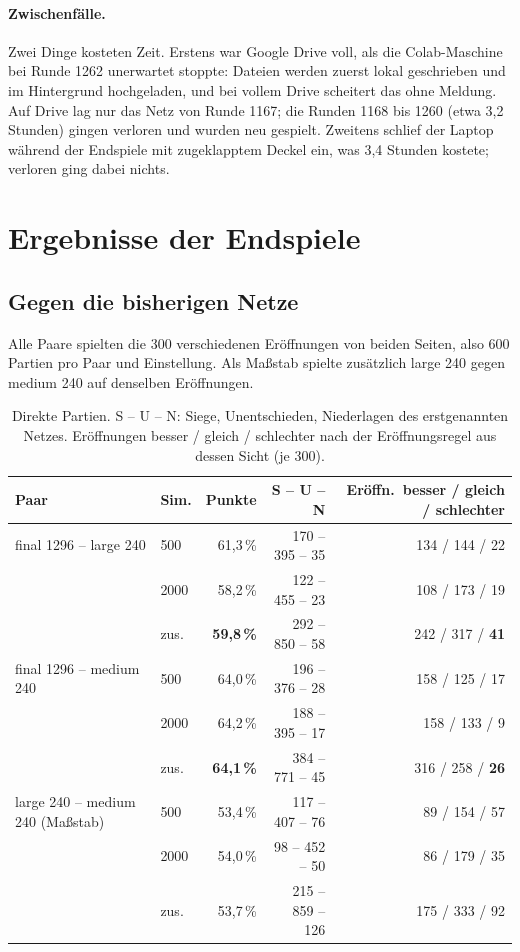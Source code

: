\documentclass[11pt,a4paper]{article}
\begin{document}
\paragraph{Zwischenfälle.} Zwei Dinge kosteten Zeit. Erstens war Google Drive voll, als die Colab-Maschine
bei Runde 1262 unerwartet stoppte: Dateien werden zuerst lokal geschrieben und im Hintergrund hochgeladen,
und bei vollem Drive scheitert das ohne Meldung. Auf Drive lag nur das Netz von Runde 1167; die Runden
1168 bis 1260 (etwa 3{,}2 Stunden) gingen verloren und wurden neu gespielt. Zweitens schlief der Laptop
während der Endspiele mit zugeklapptem Deckel ein, was 3{,}4 Stunden kostete; verloren ging dabei nichts.

\section{Ergebnisse der Endspiele}

\subsection{Gegen die bisherigen Netze}

Alle Paare spielten die 300 verschiedenen Eröffnungen von beiden Seiten, also 600 Partien pro Paar und
Einstellung. Als Maßstab spielte zusätzlich large 240 gegen medium 240 auf denselben Eröffnungen.

\begin{table}[ht]
\centering
\footnotesize
\setlength{\tabcolsep}{5pt}
\begin{tabular}{llrrr}
\toprule
Paar & Sim. & Punkte & S -- U -- N & Eröffn.\ besser / gleich / schlechter \\
\midrule
final 1296 -- large 240 & 500  & 61{,}3\,\% & 170 -- 395 -- 35 & 134 / 144 / 22 \\
                        & 2000 & 58{,}2\,\% & 122 -- 455 -- 23 & 108 / 173 / 19 \\
                        & zus. & \textbf{59{,}8\,\%} & 292 -- 850 -- 58 & 242 / 317 / \textbf{41} \\
\midrule
final 1296 -- medium 240 & 500  & 64{,}0\,\% & 196 -- 376 -- 28 & 158 / 125 / 17 \\
                         & 2000 & 64{,}2\,\% & 188 -- 395 -- 17 & 158 / 133 / 9 \\
                         & zus. & \textbf{64{,}1\,\%} & 384 -- 771 -- 45 & 316 / 258 / \textbf{26} \\
\midrule
large 240 -- medium 240 (Maßstab) & 500  & 53{,}4\,\% & 117 -- 407 -- 76 & 89 / 154 / 57 \\
                                  & 2000 & 54{,}0\,\% & 98 -- 452 -- 50 & 86 / 179 / 35 \\
                                  & zus. & 53{,}7\,\% & 215 -- 859 -- 126 & 175 / 333 / 92 \\
\bottomrule
\end{tabular}
\caption{Direkte Partien. S -- U -- N: Siege, Unentschieden, Niederlagen des erstgenannten Netzes.
Eröffnungen besser / gleich / schlechter nach der Eröffnungsregel aus dessen Sicht (je 300).}
\label{tab:netze}
\end{table}
\end{document}
